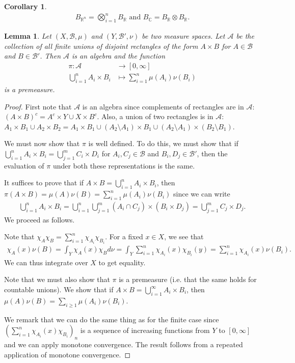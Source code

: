 \documentclass[11pt]{amsart}
\newtheorem{lemma}[theorem]{Lemma}
\newtheorem{corollary}[theorem]{Corollary}
\theoremstyle{definition}
\numberwithin{equation}{section}
\begin{document}
\begin{corollary}
    \begin{align*}
        B_{\mathbb R^n}=\bigotimes_{i=1}^nB_\mathbb R\text{ and }B_\mathbb C=B_\mathbb R\otimes B_\mathbb R.
    \end{align*}
\end{corollary}
\begin{lemma}
    Let $(X,\mathcal B,\mu)$ and $(Y,\mathcal B',\nu)$ be two measure spaces. Let $\mathcal A$ be the collection of all finite unions of disjoint rectangles of the form $A\times B$ for $A\in\mathcal B$ and $B\in\mathcal B'$. Then $\mathcal A$ is an algebra and the function
    \begin{align*}
        \pi:\mathcal A&\to[0,\infty]\\
        \bigcup_{i=1}^n A_i\times B_i&\mapsto\sum_{i=1}^n\mu(A_i)\nu(B_i)
    \end{align*}
    is a premeasure.
\end{lemma}
\begin{proof}
    First note that $\mathcal A$ is an algebra since complements of rectangles are in $\mathcal A$: $(A\times B)^c=A^c\times Y\cup X\times B^c$. Also, a union of two rectangles is in $\mathcal A$: $A_1\times B_1\cup A_2\times B_2=A_1\times B_1\cup (A_2\setminus A_1)\times B_1\cup (A_2\setminus A_1)\times (B_2\setminus B_1)$.

    We must now show that $\pi$ is well defined. To do this, we must show that if $\bigcup_{i=1}^nA_i\times B_i=\bigcup_{j=1}^mC_i\times D_i$ for $A_i,C_j\in \mathcal B$ and $B_i,D_j\in\mathcal B'$, then the evaluation of $\pi$ under both these representations is the same.

    It suffices to prove that if $A\times B=\bigcup_{i=1}^nA_i\times B_i$, then $\pi(A\times B)=\mu(A)\nu(B)=\sum_{i=1}^n\mu(A_i)\nu(B_i)$ since we can write 
    \begin{align*}
        \bigcup_{i=1}^nA_i\times B_i=\bigcup_{i=1}^n\bigcup_{j=1}^m(A_i\cap C_j)\times (B_i\times D_j)=\bigcup_{j=1}^mC_j\times D_j.
    \end{align*}
    We proceed as follows.

    Note that $\chi_A\chi_B=\sum_{i=1}^n\chi_{A_i}\chi_{B_i}$. For a fixed $x\in X$, we see that
    \begin{align*}
        \chi_A(x)\nu(B)=\int_Y\chi_A(x)\chi_Bd\nu=\int_Y\sum_{i=1}^n\chi_{A_i}(x)\chi_{B_i}(y)=\sum_{i=1}^n\chi_{A_i}(x)\nu(B_i).
    \end{align*}
    We can thus integrate over $X$ to get equality.

    Note that we must also show that $\pi$ is a premeasure (i.e. that the same holds for countable unions). We show that if $A\times B=\bigcup_{i=1}^\infty A_i\times B_i$, then $\mu(A)\nu(B)=\sum_{i\ge1}\mu(A_i)\nu(B_i)$.

    We remark that we can do the same thing as for the finite case since $(\sum_{i=1}^n\chi_{A_i}(x)\chi_{B_i})_n$ is a sequence of increasing functions from $Y$ to $[0,\infty]$ and we can apply monotone convergence. The result follows from a repeated application of monotone convergence.
\end{proof}
\end{document}
